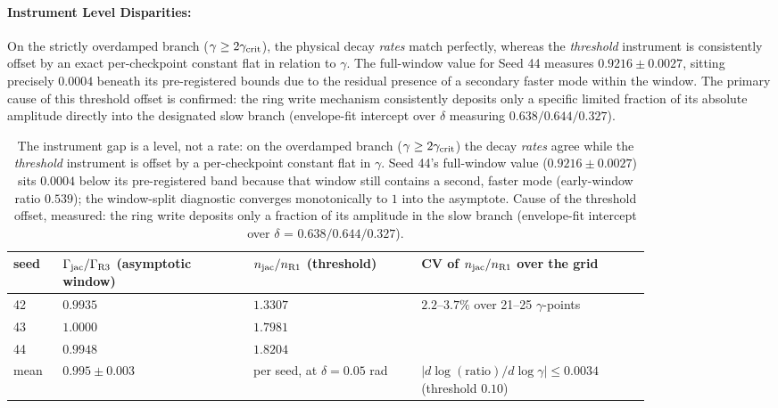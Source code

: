 \documentclass{article}
\begin{document}
\paragraph{Instrument Level Disparities:} On the strictly overdamped branch ($\gamma\ge2\gamma_{\rm crit}$), the physical decay \emph{rates} match perfectly, whereas the \emph{threshold} instrument is consistently offset by an exact per-checkpoint constant flat in relation to $\gamma$. The full-window value for Seed 44 measures $0.9216\pm0.0027$, sitting precisely $0.0004$ beneath its pre-registered bounds due to the residual presence of a secondary faster mode within the window. The primary cause of this threshold offset is confirmed: the ring write mechanism consistently deposits only a specific limited fraction of its absolute amplitude directly into the designated slow branch (envelope-fit intercept over $\delta$ measuring $0.638/0.644/0.327$).

\begin{table}[!htb]\centering\small
\caption{The instrument gap is a level, not a rate: on the overdamped branch ($\gamma\ge2\gamma_{\rm crit}$) the decay \emph{rates} agree while the \emph{threshold} instrument is offset by a per-checkpoint constant flat in $\gamma$. Seed 44's full-window value ($0.9216\pm0.0027$) sits $0.0004$ below its pre-registered band because that window still contains a second, faster mode (early-window ratio $0.539$); the window-split diagnostic converges monotonically to $1$ into the asymptote. Cause of the threshold offset, measured: the ring write deposits only a fraction of its amplitude in the slow branch (envelope-fit intercept over $\delta$ = $0.638/0.644/0.327$).}
\begin{tabular}{p{0.06\linewidth}p{0.25\linewidth}p{0.22\linewidth}p{0.30\linewidth}}
\toprule
seed & $\Gamma_{\rm jac}/\Gamma_{\rm R3}$ (asymptotic window) & $n_{\rm jac}/n_{\rm R1}$ (threshold) & CV of $n_{\rm jac}/n_{\rm R1}$ over the grid\\
\midrule
42 & $0.9935$ & $1.3307$ & \multirow{3}{*}{$2.2$--$3.7\%$ over 21--25 $\gamma$-points}\\
43 & $1.0000$ & $1.7981$ & \\
44 & $0.9948$ & $1.8204$ & \\
\midrule
mean & $0.995\pm0.003$ & per seed, at $\delta=0.05$ rad & $|d\log(\text{ratio})/d\log\gamma|\le0.0034$ (threshold $0.10$)\\
\bottomrule
\end{tabular}
\end{table}
\end{document}
